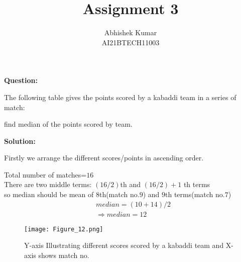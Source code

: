 \documentclass[journal, 8pt, twocolumn]{IEEEtran}
\title{Assignment 3 \\}
\author{Abhishek Kumar\\AI21BTECH11003}
\begin{document}
	
	\maketitle
	
	\textbf{Question:}
	
	The following table gives the points scored by a kabaddi team in a series of match:
	\begin{table}[!htb]
		
		\caption{}
		\label{table:data}
	\end{table}
	
	
	find median of the points scored by team.
	
	\textbf{Solution:}
	
	Firstly we arrange the different scores/points in ascending order.
	
	\begin{table}[!htb]
		
		\caption{}
		\label{table:data1}
	\end{table}
	
	Total number of matches=$16$\\
	There are two middle terms: $(16/2)$th and $(16/2)+1$ th terms\\
	so median should be mean of $8$th(match no.$9$) and $9$th terms(match no.$7$)
	\begin{align}
		&median=(10+14)/2\\
		&\Rightarrow median=12
	\end{align}
	
	\begin{figure}
		\centering
		\texttt{[image: Figure\_12.png]}
		\caption{Y-axis Illustrating different scores scored by a kabaddi team and X-axis shows match no. }
		\label{fig:1}
	\end{figure}
	
	
\end{document}
